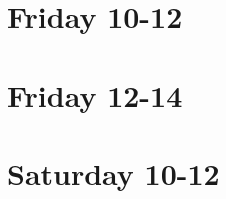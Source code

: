 \tableofcontents

\clearpage

\section{Friday 10-12}







\clearpage

\section{Friday 12-14}







\clearpage

\section{Saturday 10-12}





